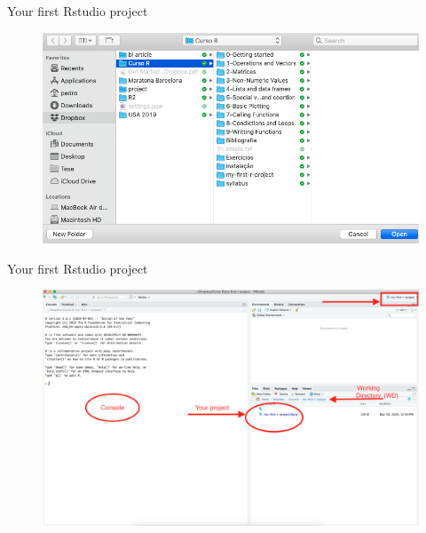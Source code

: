 \documentclass[ignorenonframetext,]{beamer}
\begin{document}
\begin{frame}{Your first Rstudio project}
\protect\hypertarget{your-first-rstudio-project-4}{}

\begin{figure}
\includegraphics[scale=0.33]{figures/new-project-5}
\end{figure}

\end{frame}

\begin{frame}{Your first Rstudio project}
\protect\hypertarget{your-first-rstudio-project-5}{}

\begin{figure}
\includegraphics[scale=0.19]{figures/environment}
\end{figure}

\end{frame}
\end{document}
